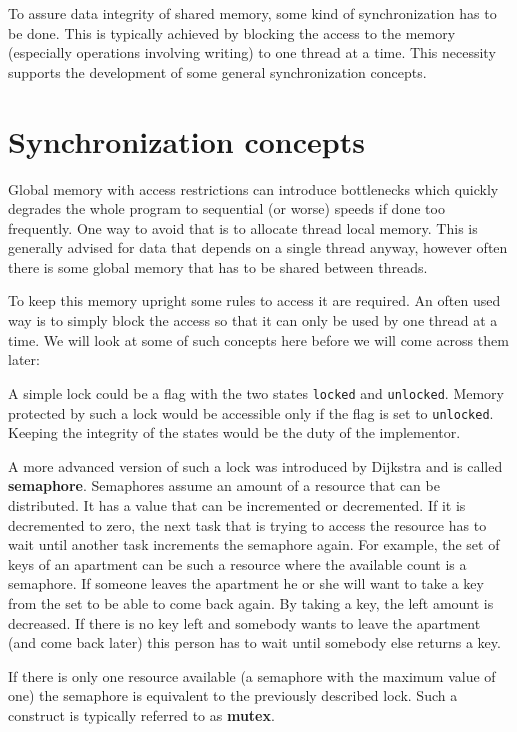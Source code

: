 To assure data integrity of shared memory, some kind of synchronization has to be done. This is typically achieved by blocking the access to the memory (especially operations involving writing) to one thread at a time. This necessity supports the development of some general synchronization concepts.

\section{Synchronization concepts}
Global memory with access restrictions can introduce bottlenecks which quickly degrades the whole program to sequential (or worse) speeds if done too frequently. One way to avoid that is to allocate thread local memory. This is generally advised for data that depends on a single thread anyway, however often there is some global memory that has to be shared between threads.

To keep this memory upright some rules to access it are required. An often used way is to simply block the access so that it can only be used by one thread at a time. We will look at some of such concepts here before we will come across them later:
 
A simple lock could be a flag with the two states \texttt{locked} and \texttt{unlocked}. Memory protected by such a lock would be accessible only if the flag is set to \texttt{unlocked}. Keeping the integrity of the states would be the duty of the implementor.

A more advanced version of such a lock was introduced by Dijkstra\cite{dijkstra1968cooperating} and is called \textbf{semaphore}. Semaphores assume an amount of a resource that can be distributed. It has a value that can be incremented or decremented. If it is decremented to zero, the next task that is trying to access the resource has to wait until another task increments the semaphore again. For example, the set of keys of an apartment can be such a resource where the available count is a semaphore. If someone leaves the apartment he or she will want to take a key from the set to be able to come back again. By taking a key, the left amount is decreased. If there is no key left and somebody wants to leave the apartment (and come back later) this person has to wait until somebody else returns a key.

If there is only one resource available (a semaphore with the maximum value of one) the semaphore is equivalent to the previously described lock. Such a construct is typically referred to as \textbf{mutex}.

